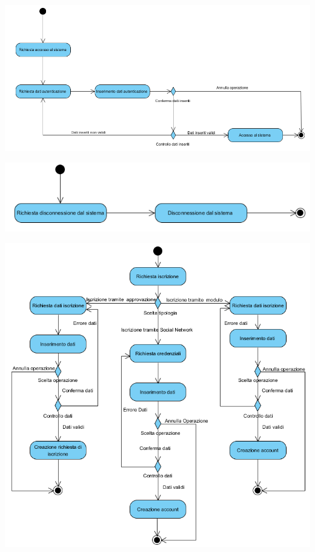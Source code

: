 \begin{center}
			\includegraphics[width=\textwidth]{assets/visualParadigm/attivita/login}
\end{center}

\begin{center}
	\includegraphics[width=\textwidth]{assets/visualParadigm/attivita/logout}
\end{center}

\begin{center}
	\includegraphics[width=\textwidth]{assets/visualParadigm/attivita/iscrizioni}
\end{center}

